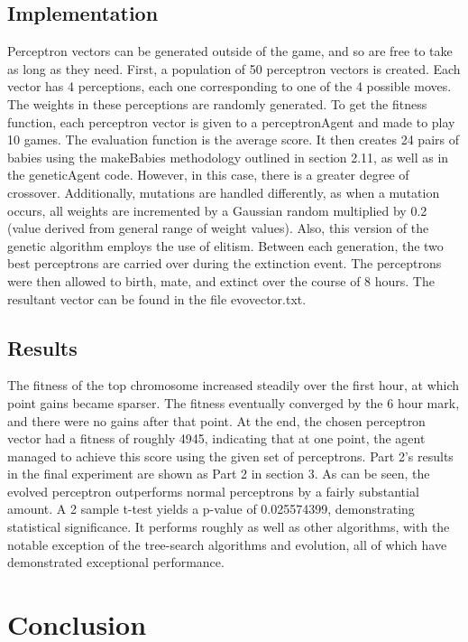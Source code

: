 \documentclass[a4paper]{article}
\begin{document}
\subsection{Implementation}
Perceptron vectors can be generated outside of the game, and so are free to take as long as they need.  First, a population of 50 perceptron vectors is created.  Each vector has 4 perceptions, each one corresponding to one of the 4 possible moves.  The weights in these perceptions are randomly generated.  To get the fitness function, each perceptron vector is given to a perceptronAgent and made to play 10 games.  The evaluation function is the average score.  It then creates 24 pairs of babies using the makeBabies methodology outlined in section  2.11, as well as in the geneticAgent code.  However, in this case, there is a greater degree of crossover.  Additionally, mutations are handled differently, as when a mutation occurs, all weights are incremented by a Gaussian random multiplied by 0.2 (value derived from general range of weight values).  Also, this version of the genetic algorithm employs the use of elitism.  Between each generation, the two best perceptrons are carried over during the extinction event.  The perceptrons were then allowed to birth, mate, and extinct over the course of 8 hours.  The resultant vector can be found in the file evovector.txt.  

\subsection{Results}
The fitness of the top chromosome increased steadily over the first hour, at which point gains became sparser.  The fitness eventually converged by the 6 hour mark, and there were no gains after that point.  At the end, the chosen perceptron vector had a fitness of roughly 4945, indicating that at one point, the agent managed to achieve this score using the given set of perceptrons.  Part 2's results in the final experiment are shown as Part 2 in section 3.  As can be seen, the evolved perceptron outperforms normal perceptrons by a fairly substantial amount.  A 2 sample t-test yields a p-value of 0.025574399, demonstrating statistical significance.  It performs roughly as well as other algorithms, with the notable exception of the tree-search algorithms and evolution, all of which have demonstrated exceptional performance.

\section {Conclusion}
\end{document}
